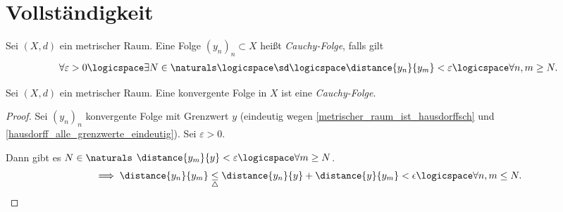 \section{Vollständigkeit}
\begin{definition}
    Sei \( (X,d) \) ein metrischer Raum. Eine Folge \( (y_n)_n \subset X\) heißt \emph{Cauchy-Folge}, falls gilt
    \begin{align*}
        \forall \varepsilon>0 \logicspace \exists N\in \naturals \logicspace\text{\sd}\logicspace \distance{y_n}{ y_m}<\varepsilon \logicspace \forall n,m\geq N.
    \end{align*} 
\end{definition}
\begin{lemma}
    Sei \( (X,d) \)  ein metrischer Raum. Eine konvergente Folge in \( X \)  ist eine \emph{Cauchy-Folge}.
\end{lemma}
\begin{proof}
    Sei \( (y_n)_n \)  konvergente Folge mit Grenzwert \( y \) (eindeutig wegen \ref{metrischer_raum_ist_hausdorffsch} und \ref{hausdorff_alle_grenzwerte_eindeutig}). Sei \( \varepsilon>0 \).

    Dann gibt es \( N\in \naturals  \) \sd \( \distance{y_m}{ y}<\varepsilon \logicspace  \forall m\geq N\).
    \begin{align*}
        \implies \distance{y_n}{y_m}\underset{\triangle}{\leq}\distance{y_n}{y}+\distance{y}{y_m}<\epsilon \logicspace \forall n,m\leq N.
    \end{align*}   
\end{proof}
